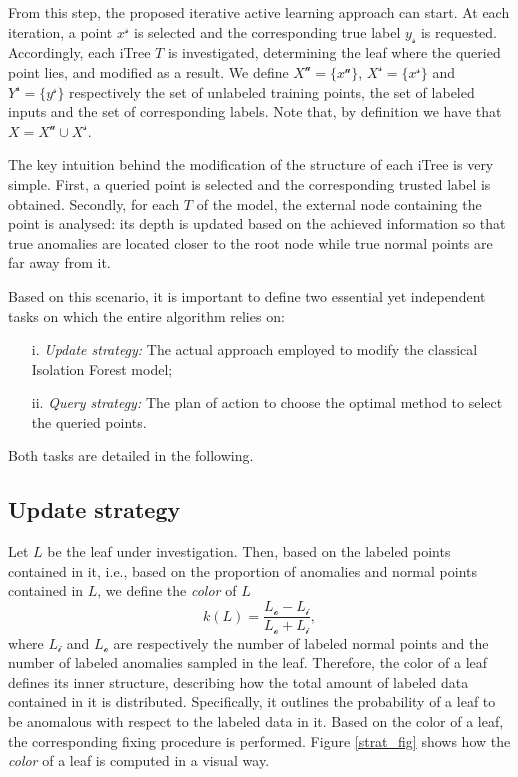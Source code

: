 From this step, the proposed iterative active learning approach can start. At each iteration, a point $x^{\mathcal{s}}$ is selected and the corresponding true label $y_{\mathcal{s}}$ is requested. Accordingly, each iTree $T$ is investigated, determining the leaf where the queried point lies, and modified as a result. We define $X^\mathcal{u}=\{x^{\mathcal{u}}\}$, $X^\mathcal{s}=\{x^{\mathcal{s}}\}$ and $Y^\mathcal{s}=\{y^{\mathcal{s}}\}$ respectively the set of unlabeled training points, the set of labeled inputs and the set of corresponding labels. Note that, by definition we have that $X= X^\mathcal{u} \cup X^\mathcal{s}$. 

The key intuition behind the modification of the structure of each iTree is very simple. First, a queried point is selected and the corresponding trusted label is obtained. Secondly, for each $T$ of the model, the external node containing the point is analysed: its depth is updated based on the achieved information so that true anomalies are located closer to the root node while true normal points are far away from it. 



Based on this scenario, it is important to define two essential yet independent tasks on which the entire algorithm relies on:
\begin{enumerate}
    \item[i.] \textit{Update strategy:} The actual approach employed to modify the classical Isolation Forest model;
    \item[ii.] \textit{Query strategy:} The plan of action to choose the optimal method to select the queried points. 
\end{enumerate}
Both tasks are detailed in the following.



\subsection{Update strategy}
Let $L$ be the leaf under investigation. Then, based on the labeled points contained in it, i.e., based on the proportion of anomalies and normal points contained in $L$, we define the \textit{color} of $L$ 
\begin{equation}
    k(L) = \frac{L_\mathcal{o}-L_\mathcal{i}}{L_\mathcal{o}+L_\mathcal{i}},
    \label{color}
\end{equation}
where $L_\mathcal{i}$ and $L_\mathcal{o}$ are respectively the number of labeled normal points and the number of labeled anomalies sampled in the leaf. Therefore, the color of a leaf defines its inner structure, describing how the total amount of labeled data contained in it is distributed. Specifically, it outlines the probability of a leaf to be anomalous with respect to the labeled data in it. Based on the color of a leaf, the corresponding fixing procedure is performed. Figure \ref{strat_fig} shows how the \textit{color} of a leaf is computed in a visual way. 

